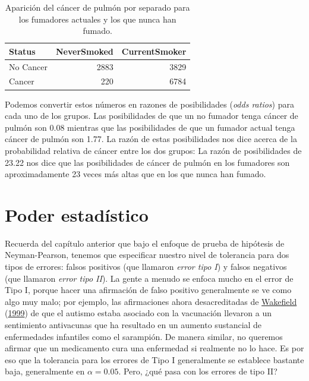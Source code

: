 \documentclass[
  12pt,
]{book}
\begin{document}
\begin{table}

\caption{\label{tab:smokingData}Aparición del cáncer de pulmón por separado para los fumadores actuales y los que nunca han fumado.}
\centering
\begin{tabular}[t]{l|r|r}
\hline
Status & NeverSmoked & CurrentSmoker\\
\hline
No Cancer & 2883 & 3829\\
\hline
Cancer & 220 & 6784\\
\hline
\end{tabular}
\end{table}

Podemos convertir estos números en razones de posibilidades (\emph{odds ratios}) para cada uno de los grupos. Las posibilidades de que un no fumador tenga cáncer de pulmón son 0.08 mientras que las posibilidades de que un fumador actual tenga cáncer de pulmón son 1.77. La razón de estas posibilidades nos dice acerca de la probabilidad relativa de cáncer entre los dos grupos: La razón de posibilidades de 23.22 nos dice que las posibilidades de cáncer de pulmón en los fumadores son aproximadamente 23 veces más altas que en los que nunca han fumado.

\hypertarget{statistical-power}{%
\section{Poder estadístico}\label{statistical-power}}

Recuerda del capítulo anterior que bajo el enfoque de prueba de hipótesis de Neyman-Pearson, tenemos que especificar nuestro nivel de tolerancia para dos tipos de errores: falsos positivos (que llamaron \emph{error tipo I}) y falsos negativos (que llamaron \emph{error tipo II}). La gente a menudo se enfoca mucho en el error de Tipo I, porque hacer una afirmación de falso positivo generalmente se ve como algo muy malo; por ejemplo, las afirmaciones ahora desacreditadas de \protect\hyperlink{ref-wake:1999}{Wakefield} (\protect\hyperlink{ref-wake:1999}{1999}) de que el autismo estaba asociado con la vacunación llevaron a un sentimiento antivacunas que ha resultado en un aumento sustancial de enfermedades infantiles como el sarampión. De manera similar, no queremos afirmar que un medicamento cura una enfermedad si realmente no lo hace. Es por eso que la tolerancia para los errores de Tipo I generalmente se establece bastante baja, generalmente en \(\alpha = 0.05\). Pero, ¿qué pasa con los errores de tipo II?
\end{document}
